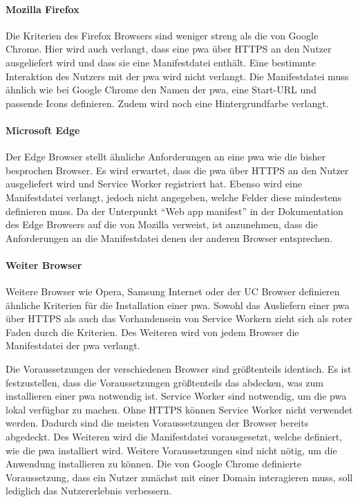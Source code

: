 \documentclass[12pt, parskip=half]{scrartcl}       %
\begin{document}
\paragraph{Mozilla Firefox}
Die Kriterien des Firefox Browsers sind weniger streng als die von Google Chrome.
Hier wird auch verlangt, dass eine \ac{pwa} über HTTPS an den Nutzer ausgeliefert wird und dass sie eine Manifestdatei enthält.
Eine bestimmte Interaktion des Nutzers mit der \ac{pwa} wird nicht verlangt.
Die Manifestdatei muss ähnlich wie bei Google Chrome den Namen der \ac{pwa}, eine Start-URL und passende Icons definieren.
Zudem wird noch eine Hintergrundfarbe verlangt.

\paragraph{Microsoft Edge}
Der Edge Browser stellt ähnliche Anforderungen an eine \ac{pwa} wie die bisher besprochen Browser.
Es wird erwartet, dass die \ac{pwa} über HTTPS an den Nutzer ausgeliefert wird und Service Worker registriert hat.
Ebenso wird eine Manifestdatei verlangt, jedoch nicht angegeben, welche Felder diese mindestens definieren muss.
Da der Unterpunkt \enquote{Web app manifest} in der Dokumentation des Edge Browsers auf die von Mozilla verweist, ist anzunehmen, dass die Anforderungen an die Manifestdatei denen der anderen Browser entsprechen.

\paragraph{Weiter Browser}
Weitere Browser wie Opera\cite{devopera_pwainstallcriteria}, Samsung Internet\cite{samsung_pwainstallcriteria} oder der UC Browser\cite{ucweb_pwainstallcriteria} definieren ähnliche Kriterien für die Installation einer \ac{pwa}.
Sowohl das Ausliefern einer \ac{pwa} über HTTPS als auch das Vorhandensein von Service Workern zieht sich als roter Faden durch die Kriterien.
Des Weiteren wird von jedem Browser die Manifestdatei der \ac{pwa} verlangt.

Die Voraussetzungen der verschiedenen Browser sind größtenteils identisch.
Es ist festzustellen, dass die Voraussetzungen größtenteils das abdecken, was zum installieren einer \ac{pwa} notwendig ist.
Service Worker sind notwendig, um die \ac{pwa} lokal verfügbar zu machen.
Ohne HTTPS können Service Worker nicht verwendet werden.
Dadurch sind die meisten Voraussetzungen der Browser bereits abgedeckt.
Des Weiteren wird die Manifestdatei vorausgesetzt, welche definiert, wie die \ac{pwa} installiert wird.
Weitere Voraussetzungen sind nicht nötig, um die Anwendung installieren zu können.
Die von Google Chrome definierte Voraussetzung, dass ein Nutzer zunächst mit einer Domain interagieren muss, soll lediglich das Nutzererlebnis verbessern.
\end{document}

